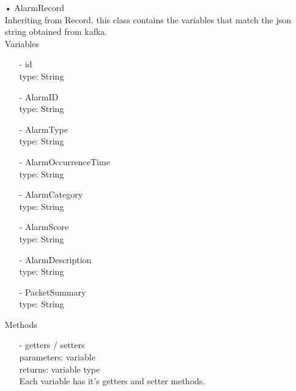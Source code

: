 \documentclass[oneside, english, final]{design}
\begin{document}
\begin{itemize}
	\item[•]AlarmRecord
		  \\Inheriting from Record, this class contains the variables that match the json string obtained from kafka.
	      \\Variables
	      \begin{itemize}
		       	\item[-] id
		            \\type: String
 				\item[-] AlarmID
		            \\type: String
 				\item[-] AlarmType
		            \\type: String
		        \item[-] AlarmOccurrenceTime
		            \\type: String
		        \item[-] AlarmCategory
		            \\type: String
		        \item[-] AlarmScore
		            \\type: String
		        \item[-] AlarmDescription
		            \\type: String
		        \item[-] PacketSummary
		            \\type: String		            
		            
	      \end{itemize}
	      Methods
	      \begin{itemize}
		      \item[-]getters / setters
		            \\parameters: variable
		            \\returns: variable type
		            \\Each variable has it's getters and setter methods.
	      \end{itemize}


\end{itemize}
\end{document}
